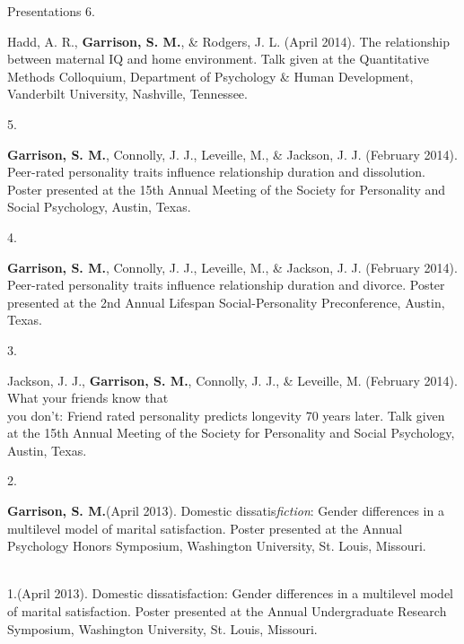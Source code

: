 \documentclass {resume}
\newcommand{\meb}{{\bf Garrison, S. M.}\xspace}
\begin{document}
\begin{rSection}{\textrm{Presentations}}
6.\hspace* {2.5 mm}\begin{samepage}Hadd, A. R., \meb, \& Rodgers, J. L. (April 2014). The relationship between maternal IQ and \hspace* {6 mm}home environment. Talk given at the Quantitative Methods Colloquium, Department of Psychology \& Human \hspace* {6 mm}Development, Vanderbilt University, Nashville, Tennessee. \smallskip\\\end{samepage}%
5.\hspace* {2.5 mm}\begin{samepage}\meb, Connolly, J. J., Leveille, M., \& Jackson, J. J. (February 2014). Peer-rated personality traits \hspace* {6 mm}influence relationship duration and dissolution. Poster presented at the 15th Annual Meeting of the Society for \hspace* {6 mm}Personality and Social Psychology, Austin, Texas.\smallskip\\\end{samepage}
4.\hspace* {2.5 mm}\begin{samepage}\meb, Connolly, J. J., Leveille, M., \& Jackson, J. J. (February 2014). Peer-rated personality traits \hspace* {6 mm}influence relationship duration and divorce. Poster presented at the 2nd Annual Lifespan Social-Personality  \hspace* {6 mm}Preconference, Austin, Texas.\smallskip\\\end{samepage}
3.\hspace* {2.5 mm}\begin{samepage}Jackson, J. J., \textbf{Garrison, S. M.}, Connolly, J. J., \& Leveille, M. (February 2014). What your friends know that\\ 
\hspace* {6 mm}you don't: Friend rated personality predicts longevity 70 years later. Talk given at the 15th Annual Meeting \hspace* {6 mm}of the Society for Personality and  Social Psychology, Austin, Texas. \smallskip\\\end{samepage}
2.\hspace* {2.5 mm}\begin{samepage}\meb (April 2013). Domestic dissatis{\em fiction}: Gender differences in a multilevel model of marital \hspace* {6 mm}satisfaction. Poster presented at the Annual Psychology Honors Symposium, Washington  University, St. Louis, \hspace* {6 mm}Missouri.\end{samepage}\smallskip\\
1.\hspace* {2.5 mm}\meb (April 2013). Domestic dissatisfaction: Gender differences in a multilevel model of marital \hspace* {6 mm}satisfaction. Poster presented at the Annual Undergraduate Research Symposium, Washington University, St. \hspace* {6 mm}Louis, Missouri.
\end{rSection}
\end{document}

